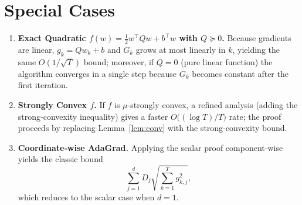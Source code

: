 \documentclass{article}
\begin{document}
\section*{Special Cases}
\begin{enumerate}[leftmargin=*]
\item \textbf{Exact Quadratic $f(w)=\tfrac{1}{2}w^{\top}Qw+b^{\top}w$ with $Q\succeq 0$.}  
Because gradients are linear, $g_{k}=Qw_{k}+b$ and $G_{k}$ grows at most linearly in $k$, yielding the same $O(1/\sqrt{T})$ bound; moreover, if $Q=0$ (pure linear function) the algorithm converges in a single step because $G_{k}$ becomes constant after the first iteration.

\item \textbf{Strongly Convex $f$.}  
If $f$ is $\mu$‑strongly convex, a refined analysis (adding the strong‑convexity inequality) gives a faster $O\bigl((\log T)/T\bigr)$ rate; the proof proceeds by replacing Lemma~\ref{lem:conv} with the strong‑convexity bound.

\item \textbf{Coordinate‑wise AdaGrad.}  
Applying the scalar proof component‑wise yields the classic bound
\[
\sum_{j=1}^{d} D_{j}\sqrt{\sum_{k=1}^{T} g_{k,j}^{2}},
\]
which reduces to the scalar case when $d=1$.
\end{enumerate}
\end{document}
